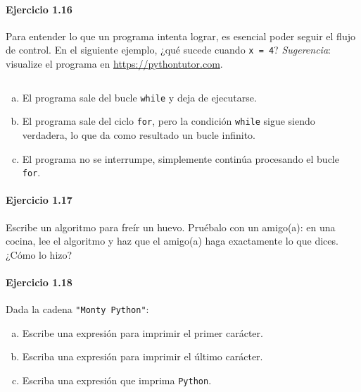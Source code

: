\paragraph{\color{DarkBlue}Ejercicio 1.16}
Para entender lo que un programa intenta lograr, es esencial poder
seguir el flujo de control.
En el siguiente ejemplo, ¿qué sucede cuando \texttt{x = 4}?
\emph{Sugerencia}: visualize el programa en
\url{https://pythontutor.com}.

\begin{listing}[ht!]
	\inputminted{python}{1.16.py}
\end{listing}

\begin{enumerate}[(a)]
	\item

	      El programa sale del bucle \texttt{while} y deja
	      de ejecutarse.

	\item

	      El programa sale del ciclo \texttt{for}, pero la
	      condición \texttt{while} sigue siendo verdadera,
	      lo que da como resultado un bucle infinito.

	\item

	      El programa no se interrumpe, simplemente continúa procesando
	      el bucle \texttt{for}.
\end{enumerate}

\paragraph{\color{DarkBlue}Ejercicio 1.17}
Escribe un algoritmo para freír un huevo.
Pruébalo con un amigo(a): en una cocina, lee el algoritmo y haz que
el amigo(a) haga exactamente lo que dices. ¿Cómo lo hizo?

\paragraph{\color{DarkBlue}Ejercicio 1.18}

Dada la cadena \texttt{"Monty Python"}:

\begin{enumerate}[(a)]
	\item

	      Escribe una expresión para imprimir el primer carácter.

	\item

	      Escriba una expresión para imprimir el último carácter.

	\item

	      Escriba una expresión que imprima
	      \texttt{Python}.
\end{enumerate}

